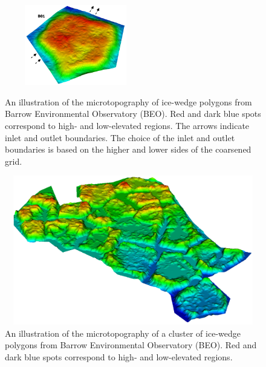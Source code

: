 \documentclass[review,11pt]{elsarticle}
\begin{document}
\begin{figure}[!h]
\includegraphics[width=6.2cm, height=3.5cm]{./figures/polygons-finescale/3DpolygonB01-3B.png} \\
\caption{An illustration of the microtopography of ice-wedge polygons from Barrow Environmental Observatory (BEO). Red and dark blue spots correspond to high- and low-elevated regions. The arrows indicate inlet and outlet boundaries. The choice of the inlet and outlet boundaries is  based on the higher and lower sides of the coarsened grid.}
\label{IWP-finemesh}
\end{figure}

\begin{figure}[!h]
\centering
\vskip -4.5cm
\includegraphics[width=12.2cm, height=6.5cm]{./figures/polygons-finescale/lobster-finemesh-elevation.png}
\caption{An illustration of the microtopography of a cluster of ice-wedge polygons from Barrow Environmental Observatory (BEO). Red and dark blue spots correspond to high- and low-elevated regions.}
\label{lobster-finemesh}
\end{figure}
\end{document}
